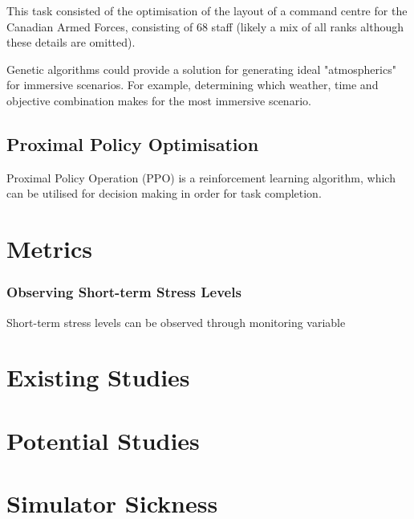 \documentclass{article}
\begin{document}
This task consisted of the optimisation of the layout of a command centre for the Canadian Armed Forces, consisting of 68 staff (likely a mix of all ranks although these details are omitted).

Genetic algorithms could provide a solution for generating ideal "atmospherics" for immersive scenarios. For example, determining which weather, time and objective combination makes for the most immersive scenario.  

\subsection{Proximal Policy Optimisation}

Proximal Policy Operation (PPO) is a reinforcement learning algorithm, which can be utilised for decision making in order for task completion. \cite{schulman2017proximal}

\section{Metrics}

\subsubsection{Observing Short-term Stress Levels}

Short-term stress levels can be observed through monitoring variable 

\section{Existing Studies}


\section{Potential Studies}



\section{Simulator Sickness}


{}

\end{document}
